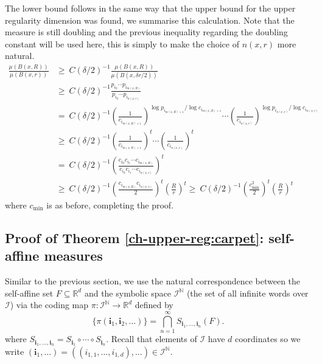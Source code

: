 The lower bound follows in the same way that the upper bound for the upper regularity dimension was found, we summarise this calculation. Note that the measure is still doubling and the previous inequality regarding the doubling constant will be used here, this is simply to make the choice of $n(x,r)$ more natural.
\begin{align*}
\frac{\mu(B(x,R))}{\mu (B(x,r))}& \ge \ C(\delta/2)^{-1} \frac{\mu(B(x,R))}{\mu (B(x,\delta r/2))}  \\
& \ge \ C(\delta/2)^{-1} \frac{p_{i_0}\cdots p_{i_{m(x,R)}}}{p_{i_0}\cdots p_{i_{n(x,r)}}} \\
& = \ C(\delta/2)^{-1}  \left(\frac{1}{c_{i_{m(x,R)+1}}}\right)^{\log p_{i_{m(x,R)+1}}/\log c_{i_{m(x,R)+1}}} \cdots \left(\frac{1}{c_{i_{n(x,r)}}}\right)^{\log p_{i_{n(x,r)}}/\log c_{i_{n(x,r)}}} \\
& \ge\  C(\delta/2)^{-1}  \left( \frac{1}{c_{i_{m(x,R)+1}}}\right)^t \cdots \left( \frac{1}{c_{i_{n(x,r)}}}\right)^t \\
& = \ C(\delta/2)^{-1} \left( \frac{c_{i_0}c_{i_1} \cdots c_{i_{m(x,R)}}}{c_{i_0}c_{i_1} \cdots c_{i_{n(x,r)}}}\right)^t \\
& \ge \  C(\delta/2)^{-1} \left( \frac{c_{i_{m(x,R)}}c_{i_{n(x,r)}}}{2}  \right)^t  \left( \frac{R}{r}\right)^t \ge \  C(\delta/2)^{-1} \left( \frac{c_{\min}^2}{2}  \right)^t  \left( \frac{R}{r}\right)^t
\end{align*}
where $c_{\min}$ is as before, completing the proof.




\subsection{Proof of Theorem \ref{ch-upper-reg:carpet}: self-affine measures} \label{ch-upper-reg:self-affine}



Similar to the previous section, we use the natural correspondence between the self-affine set $F\subseteq \mathbb{R}^d$ and the symbolic space $\mathcal{I}^{\mathbb{N}}$ (the set of all infinite words over $\mathcal{I}$) via the coding map $\pi \colon \mathcal{I}^{\mathbb{N}} \rightarrow \mathbb{R}^d$ defined by 
\[
\{\pi(\textbf{i}_1, \textbf{i}_2, \ldots)\}=  \bigcap_{n=1}^\infty S_{\textbf{i}_1,\ldots, \textbf{i}_n}(F).
\]
where $ S_{\textbf{i}_1,\ldots, \textbf{i}_n} =  S_{\textbf{i}_1} \circ \cdots \circ S_{\textbf{i}_n}$.  Recall that elements of $\mathcal{I}$ have $d$ coordinates so we write $(\mathbf{i}_1,\ldots) = ((i_{1,1},\ldots, i_{1,d}),\ldots) \in \mathcal{I}^{\mathbb{N}} $.

